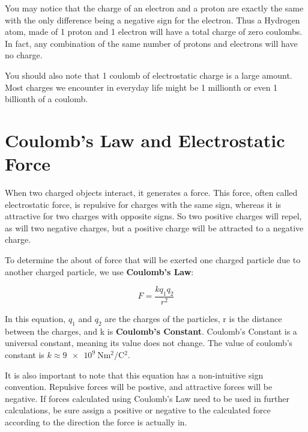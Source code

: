 	You may notice that the charge of an electron and a proton are exactly the same with the only difference being a negative sign for the electron.  Thus a Hydrogen atom, made of 1 proton and 1 electron will have a total charge of zero coulombs.  In fact, any combination of the same number of protons and electrons will have no charge. 
	
	You should also note that 1 coulomb of electrostatic charge is a large amount.  Most charges we encounter in everyday life might be 1 millionth or even 1 billionth of a coulomb. 
	
	

	\section{Coulomb's Law and Electrostatic Force}  

When two charged objects interact, it generates a force.  This force, often called electrostatic force, is repulsive for charges with the same sign, whereas it is attractive for two charges with opposite signs.  So two positive charges will repel, as will two negative charges, but a positive charge will be attracted to a negative charge.  


To determine the about of force that will be exerted one charged particle due to another charged particle, we use \textbf{Coulomb's Law}:
\begin{mdframed}[backgroundcolor=orange!20!white]

	\begin{equation}
	F = \frac{kq_1q_2}{r^2}
	\label{equation:coulombslaw}
	\end{equation}
\end{mdframed}	
	In this equation, $q_1$ and $q_2$ are the charges of the particles, r is the distance between the charges, and k is \textbf{Coulomb's Constant}.  Coulomb's Constant is a universal constant, meaning its value does not change.  The value of coulomb's constant is $k \approx \SI[per-mode = symbol]{9e9}{\N\m^2\per\coulomb^2}$.
	
	It is also important to note that this equation has a non-intuitive sign convention.  Repulsive forces will be postive, and attractive forces will be negative.  If forces calculated using Coulomb's Law need to be used in further calculations, be sure assign a positive or negative to the calculated force according to the direction the force is actually in.  
	
